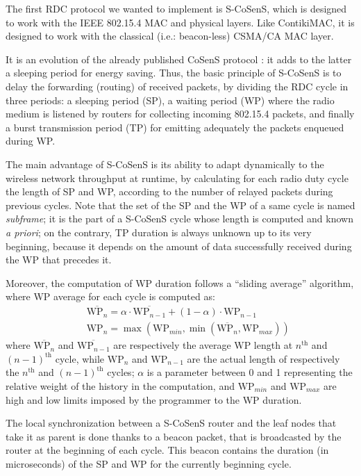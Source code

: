 \documentclass[conference]{IEEEtran}
\begin{document}
The first RDC protocol we wanted to implement is S-CoSenS, which
is designed to work with the IEEE 802.15.4 MAC and physical layers. Like
ContikiMAC, it is designed to work with the classical (i.e.: beacon-less)
CSMA/CA MAC layer.

It is an evolution of the already published CoSenS protocol \cite{CosensConf}:
it adds to the latter a sleeping period for energy saving.
Thus, the basic principle of S-CoSenS is to delay the forwarding (routing)
of received packets, by dividing the RDC cycle in three periods:
a sleeping period (SP), a waiting period (WP) where the radio medium
is listened by routers for collecting incoming 802.15.4 packets, and
finally a burst transmission period (TP) for emitting adequately
the packets enqueued during WP.

The main advantage of S-CoSenS is its ability to adapt dynamically to the
wireless network throughput at runtime, by calculating for each radio duty
cycle the length of SP and WP, according to the number of relayed
packets during previous cycles. Note that the set of the SP and the WP
of a same cycle is named \emph{subframe}; it is the part of a S-CoSenS
cycle whose length is computed and known \textit{a priori}; on the contrary,
TP duration is always unknown up to its very beginning, because it depends
on the amount of data successfully received during the WP that precedes it.

Moreover, the computation of WP duration follows a ``sliding average''
algorithm, where WP average for each cycle is computed as:
\begin{eqnarray*}
&&
\overline{\mathrm{WP}_{n}} = \alpha \cdot \overline{\mathrm{WP}_{n-1}}
                + (1 - \alpha) \cdot \mathrm{WP}_{n-1}
\\ &&
\mathrm{WP}_{n} = \max ( \mathrm{WP}_{min},
                  \min ( \overline{\mathrm{WP}_{n}}, \mathrm{WP}_{max} ) )
\end{eqnarray*}
where $\overline{\mathrm{WP}_{n}}$ and $\overline{\mathrm{WP}_{n-1}}$
are respectively the average WP length at $n^{\mathrm{th}}$ and
$(n-1)^{\mathrm{th}}$ cycle, while $\mathrm{WP}_{n}$ and $\mathrm{WP}_{n-1}$
are the actual length of respectively the $n^{\mathrm{th}}$ and
$(n-1)^{\mathrm{th}}$ cycles; $\alpha$ is a parameter between 0 and 1
representing the relative weight of the history in the computation,
and $\mathrm{WP}_{min}$ and $\mathrm{WP}_{max}$ are high and low limits
imposed by the programmer to the WP duration.

The local synchronization between a S-CoSenS router and the leaf nodes
that take it as parent is done thanks to a beacon packet, that is broadcasted
by the router at the beginning of each cycle. This beacon contains the
duration (in microseconds) of the SP and WP for the currently beginning cycle.
\end{document}
